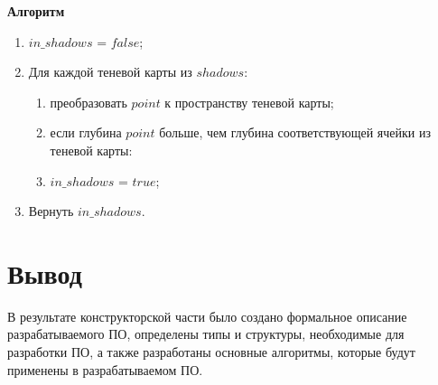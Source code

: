 \textbf{Алгоритм}
\begin{enumerate}
	\item $in\_shadows$ = $false$;
	\item Для каждой теневой карты из $shadows$:
	\begin{enumerate}
		\item преобразовать $point$ к пространству теневой карты;
		\item если глубина $point$ больше, чем глубина соответствующей ячейки из теневой карты:
		\item $in\_shadows$ = $true$;
	\end{enumerate}
	\item Вернуть $in\_shadows$.
\end{enumerate}


\section*{Вывод}

В результате конструкторской части было создано формальное описание разрабатываемого ПО, определены типы и структуры, необходимые для разработки ПО, а также разработаны основные алгоритмы, которые будут применены в разрабатываемом ПО.

\clearpage
